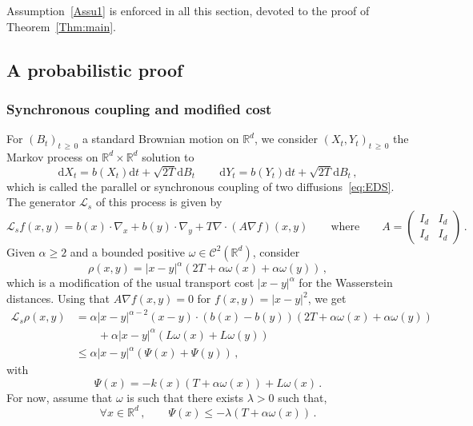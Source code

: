 \documentclass[AHL,Unicode,longabstracts,published]{cedram}
\newcommand{\R}{\mathbb R}
\newcommand{\clC}{\mathcal C}
\newcommand{\clL}{\mathcal L}
\newcommand{\dd}{\mathrm{d}}
\newcommand{\na}{\nabla}
\newcommand{\1}{\mathbbm{1}}
\newcommand{\nv}[1]{#1}
\let\oldforall\forall
\renewcommand*{\forall}{\mathrel{\oldforall}}
\newcommand{\R}{\mathbb R}
\begin{document}
Assumption~\ref{Assu1} is enforced in all this section, devoted to the proof of Theorem~\ref{Thm:main}.

\subsection{A probabilistic proof}\label{sec:demo-couplage}

\subsubsection{Synchronous coupling and modified \nv{cost}}\label{Sec:preuve_couplage}
For $(B_t)_{t\,\geqslant\,0}$ a standard Brownian motion on $\R^d$, we consider $(X_t,Y_t)_{t\,\geqslant\,0}$ the Markov process on $\R^d\times\R^d$ solution to
\[
\dd X_t = b(X_t) \dd t + \sqrt{2T}\dd B_t\,\qquad \dd Y_t = b(Y_t) \dd t + \sqrt{2T}\dd B_t\,,
\]
which is called the parallel or synchronous coupling of two diffusions~\eqref{eq:EDS}. The generator $\clL_s$ of this process is given by
\[
\clL_s f(x,y) = b(x)\cdot\na_x + b(y)\cdot \na_y + T \na \cdot \left( A \na f\right) (x,y) \qquad \text{where} \qquad A=
\begin{pmatrix} I_d & I_d \\ I_d & I_d
\end{pmatrix} \,.
\]
Given $\alpha\geqslant 2$ and a bounded positive $\nv{\omega}\in\clC^2(\R^d)$, consider
\[
\rho(x,y)=|x-y|^\alpha \left( 2T + \alpha \nv{\omega}(x)+ \alpha \nv{\omega}(y)\right)\,,
\]
which is a modification of the usual transport cost $|x-y|^\alpha$ for the Wasserstein distances. Using that $A \na f(x,y)=0$ for $f(x,y)=|x-y|^2$, we get
\begin{align*}
\clL_s \rho(x,y) & = \alpha |x-y|^{\alpha-2} (x-y)\cdot \left( b(x)-b(y)\right) \left( 2T + \alpha \nv{\omega}(x)+ \alpha \nv{\omega}(y)\right) \\
& \qquad + \alpha |x-y|^{\alpha} \left( L\nv{\omega}(x)+L\nv{\omega}(y)\right)\\
& \leqslant \alpha |x-y|^{\alpha} \left( \Psi(x)+\Psi(y)\right)\,,
\end{align*}
with
\begin{equation}\label{eq:Psi}
\Psi(x) = - k(x) \left( T + \alpha \nv{\omega}(x)\right) + L\nv{\omega}(x)\,.
\end{equation}
For now, assume that $\nv{\omega}$ is such that there exists $\lambda>0$ such that,
\begin{equation}\label{eq:conditionPsi}
\forall x\in\R^d\,,\qquad \Psi(x) \leqslant -\lambda \left( T+\alpha \nv{\omega}(x) \right)\,.
\end{equation}
\end{document}
